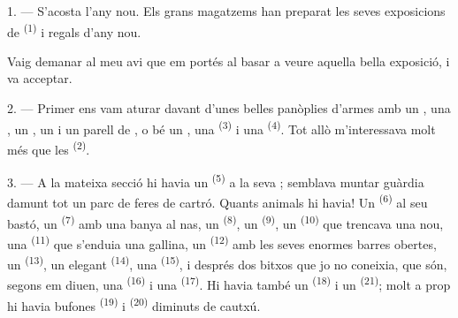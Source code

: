 %
%

\VUsaut{4.0mm}
\VUsaut{2.0mm}
\VUsaut{3.4mm}

1. --- S'acosta l'any nou. Els grans magatzems han preparat les seves exposicions de
 \textsuperscript{(1)} i regals d'any nou.

Vaig demanar al meu avi que em portés al basar a veure aquella bella exposició, i va acceptar.

2. --- Primer ens vam aturar davant d'unes belles panòplies d'armes amb un
, una , un , un 
i un parell de , o bé un , una 
\textsuperscript{(3)} i una  \textsuperscript{(4)}. Tot allò m'interessava
molt més que les  \textsuperscript{(2)}.

\VUsaut{3.0mm}
\VUsaut{2.6mm}

3. --- A la mateixa secció hi havia un  \textsuperscript{(5)} a la seva
; semblava muntar guàrdia damunt tot un parc de feres de cartró. Quants animals
hi havia! Un  \textsuperscript{(6)} al seu bastó, un 
\textsuperscript{(7)} amb una banya al nas, un
 \textsuperscript{(8)}, un  \textsuperscript{(9)}, un
 \textsuperscript{(10)} que trencava una nou, una 
\textsuperscript{(11)} que s'enduia una gallina, un  \textsuperscript{(12)}
amb les seves enormes barres obertes, un  \textsuperscript{(13)}, un elegant
 \textsuperscript{(14)}, una
 \textsuperscript{(15)}, i després dos bitxos que jo no coneixia,
que són, segons em diuen, una  \textsuperscript{(16)} i una
 \textsuperscript{(17)}. Hi havia també un 
\textsuperscript{(18)} i un  \textsuperscript{(21)}; molt a prop hi havia bufones
 \textsuperscript{(19)} i  \textsuperscript{(20)} diminuts de
cautxú.

